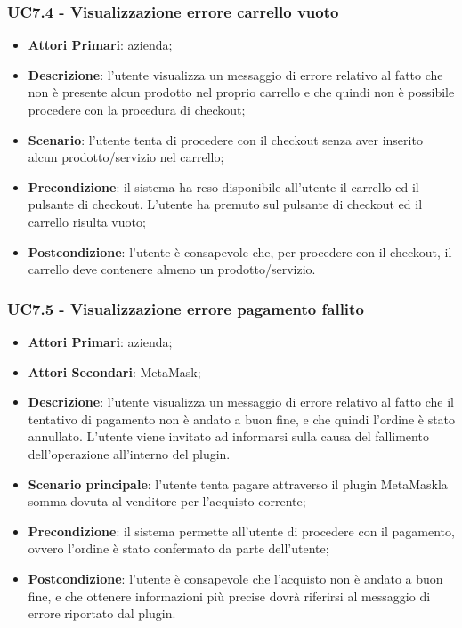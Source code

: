 \subsubsection{UC7.4 - Visualizzazione errore carrello vuoto}
\begin{itemize}
	\item \textbf{Attori Primari}: azienda;
	\item \textbf{Descrizione}:
	l'utente visualizza un messaggio di errore relativo al fatto che non è presente alcun prodotto nel proprio carrello e che quindi non è possibile procedere con la procedura di checkout;
	\item \textbf{Scenario}: l'utente tenta di procedere con il checkout senza aver inserito alcun prodotto/servizio nel carrello;
	\item \textbf{Precondizione}: il sistema ha reso disponibile all'utente il carrello ed il pulsante di checkout. L'utente ha premuto sul pulsante di checkout ed il carrello risulta vuoto; 
	\item \textbf{Postcondizione}:
	l'utente è consapevole che, per procedere con il checkout, il carrello deve contenere almeno un prodotto/servizio. 
\end{itemize}
\subsubsection{UC7.5 - Visualizzazione errore pagamento fallito}
\begin{itemize}
	\item \textbf{Attori Primari}: azienda;
	\item \textbf{Attori Secondari}: MetaMask\glo;
	\item \textbf{Descrizione}:
	l'utente visualizza un messaggio di errore relativo al fatto che il tentativo di pagamento non è andato a buon fine, e che quindi l'ordine è stato annullato. L'utente viene invitato ad informarsi sulla causa del fallimento dell'operazione all'interno del plugin.
	\item \textbf{Scenario principale}: l'utente tenta pagare attraverso il plugin MetaMask\glosp la somma dovuta al venditore per l'acquisto corrente;
	\item \textbf{Precondizione}: il sistema permette all'utente di procedere con il pagamento, ovvero l'ordine è stato confermato da parte dell'utente;
	\item \textbf{Postcondizione}:
	l'utente è consapevole che l'acquisto non è andato a buon fine, e che ottenere informazioni più precise dovrà riferirsi al messaggio di errore riportato dal plugin. 
\end{itemize}

